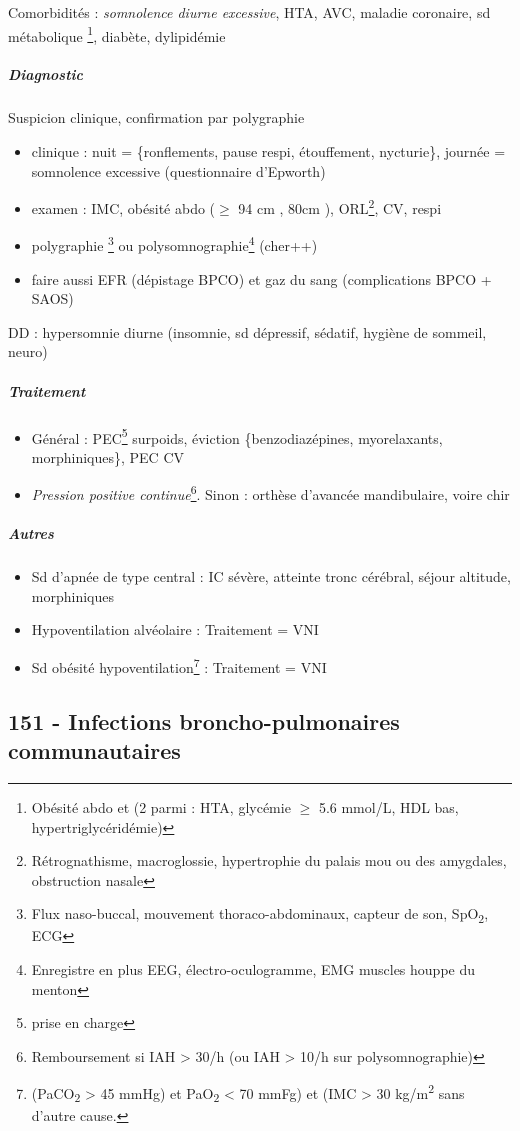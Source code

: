 \documentclass[11pt]{article}
\begin{document}
Comorbidités : \emph{somnolence diurne excessive}, HTA, AVC, maladie coronaire, sd
métabolique \footnote{Obésité abdo et (2 parmi : HTA, glycémie \(\ge\) 5.6 mmol/L, HDL bas, hypertriglycéridémie)}, diabète, dylipidémie
\subparagraph{Diagnostic}
\label{sec:orgf8c814a}
Suspicion clinique, confirmation par polygraphie 
\begin{itemize}
\item clinique : nuit = \{ronflements, pause respi, étouffement, nycturie\}, journée =
somnolence excessive (questionnaire d'Epworth)
\item examen : IMC, obésité abdo (\(\ge\) 94 cm \male, 80cm \female), ORL\footnote{Rétrognathisme, macroglossie, hypertrophie du palais mou ou des
amygdales, obstruction nasale}, CV, respi
\item polygraphie \footnote{Flux naso-buccal, mouvement thoraco-abdominaux, capteur de son, SpO\textsubscript{2}, ECG} ou polysomnographie\footnote{Enregistre en plus EEG, électro-oculogramme, EMG muscles houppe du menton} (cher++)
\item faire aussi EFR (dépistage BPCO) et gaz du sang (complications BPCO + SAOS)
\end{itemize}
DD : hypersomnie diurne (insomnie, sd dépressif, sédatif, hygiène de sommeil, neuro)
\subparagraph{Traitement}
\label{sec:org83b7850}
\begin{itemize}
\item Général : PEC\footnote{prise en charge} surpoids, éviction \{benzodiazépines, myorelaxants, morphiniques\}, PEC CV
\item \emph{Pression positive continue}\footnote{Remboursement si IAH > 30/h (ou IAH > 10/h sur polysomnographie)}. Sinon : orthèse d'avancée mandibulaire, voire chir
\end{itemize}

\subparagraph{Autres}
\label{sec:org87ad9b3}
\begin{itemize}
\item Sd d'apnée de type central : IC sévère, atteinte tronc cérébral, séjour altitude, morphiniques
\item Hypoventilation alvéolaire : Traitement = VNI
\item Sd obésité hypoventilation\footnote{(PaCO\textsubscript{2} > 45 mmHg) et PaO\textsubscript{2} < 70 mmFg) et (IMC > 30 kg/m\textsuperscript{2} sans d'autre cause.} : Traitement = VNI
\end{itemize}

\subsection{151 \textdagger{} - Infections broncho-pulmonaires communautaires}
\label{sec:orge1d98f3}
\end{document}
